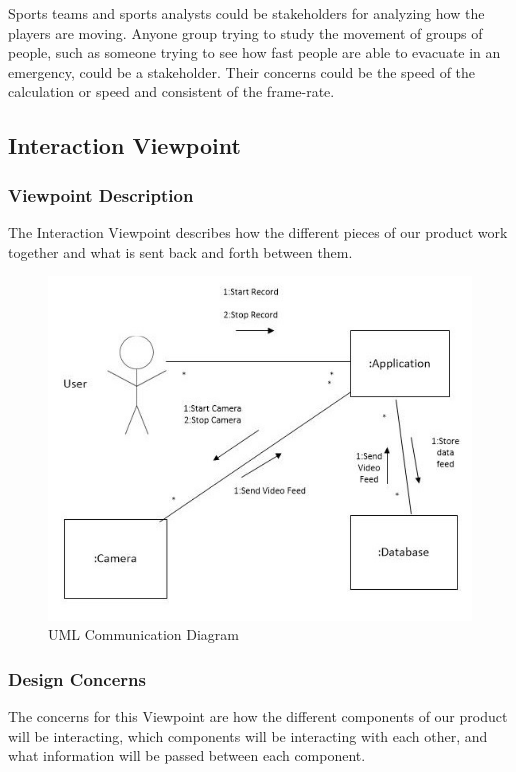 \documentclass[onecolumn, draftclsnofoot,10pt, compsoc]{IEEEtran}
\begin{document}
Sports teams and sports analysts could be stakeholders for analyzing how the players are moving.
Anyone group trying to study the movement of groups of people, such as someone trying to see how fast people are able to evacuate in an emergency, could be a stakeholder.
Their concerns could be the speed of the calculation or speed and consistent of the frame-rate.


\subsection{Interaction Viewpoint}
\subsubsection{Viewpoint Description}

The Interaction Viewpoint describes how the different pieces of our product work together and what is sent back and forth between them. 

\begin{figure}[H]
\includegraphics[scale=.7]{interaction_diagram}
\caption{UML Communication Diagram}
\label{inter}
\end{figure}


\subsubsection{Design Concerns}

The concerns for this Viewpoint are how the different components of our product will be interacting, which components will be interacting with each other, and what information will be passed between each component.
\end{document}
